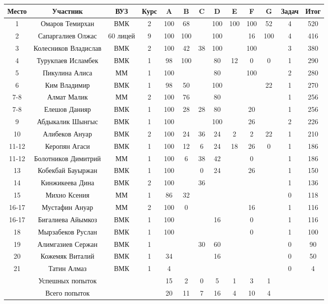 \begin{center}
\begin{longtable}{|c|c|c|c|*{7}{c|}c|c|}
\hline 
Место & Участник & ВУЗ & Курс & A & B & C & D & E & F & G & Задач & Итог\\
\hline
\endhead
1 &
Омаров Темирхан  &
ВМК & 2 &
100 &
68 &
  &
100 &
100 &
100 &
52 &
4 &
520 \\
\hline
2 &
Сапаргалиев Олжас &
60 лицей & 9 &
 100 &
 100 &
  &
100 &
  &
16 &
100 &
4 &
416 \\
\hline
3 &
Колесников Владислав &
ВМК & 2 &
100 &
42 &
38 &
100 &
  &
100 &
  &
3 &
380 \\
\hline
4 &
Турукпаев Исламбек  &
ВМК & 1 &
98 &
100 &
  &
80 &
12 &
0 &
0 &
1 &
290 \\
\hline
5 &
Пикулина Алиса &
ММ & 1 &
100 &
  &
  &
80 &
  &
100 &
  &
2 &
280 \\
\hline
6 &
Ким Владимир &
ВМК & 1 &
98 &
50 &
  &
100 &
  &
  &
22 &
1 &
270 \\
\hline
7-8 &
Алмат Малик &
ММ & 2 &
100 &
76 &
  &
80 &
  &
  &
  &
1 &
256 \\
\hline
7-8 &
Елешов Данияр &
ВМК & 1 &
100 &
28 &
28 &
80 &
  &
20 &
  &
1 &
256 \\
\hline
9 &
Абдыкалик Шынгыс &
ВМК & 1 &
100 &
  &
  &
100 &
  &
26 &
  &
2 &
226 \\
\hline
10 &
Алибеков Ануар &
ВМК & 2 &
100 &
24 &
36 &
24 &
2 &
2 &
22 &
1 &
210 \\
\hline
11-12 &
Керопян Агаси &
ВМК & 1 &
100 &
12 &
6 &
24 &
18 &
26 &
0 &
1 &
186 \\
\hline
11-12 &
Болотников Димитрий &
ММ & 1 &
100 &
6 &
38 &
42 &
  &
0 &
  &
1 &
186 \\
\hline
13 &
Кобекбай Бауыржан &
ВМК & 1 &
100 &
  &
0 &
24 &
  &
26 &
  &
1 &
150 \\
\hline
14 &
Кинжикеева Дина &
ВМК & 2 &
100 &
  &
36 &
  &
  &
  &
  &
1 &
136 \\
\hline
15 &
Михно Ксения &
ММ & 1 &
86 &
32 &
  &
  &
  &
  &
  &
0 &
118 \\
\hline
16-17 &
Мустафин Ануар &
ММ & 2 &
100 &
0 &
  &
  &
  &
16 &
  &
1 &
116 \\
\hline
16-17 &
Бигалиева Айымкоз &
ВМК & 1 &
100 &
  &
  &
16 &
  &
0 &
  &
1 &
116 \\
\hline
18 &
Мырзабеков Руслан &
ВМК & 1 &
100 &
  &
  &
  &
  &
0 &
  &
1 &
100 \\
\hline
19 &
Алимгазиев Сержан &
ВМК & 1 &
  &
  &
30 &
60 &
  &
  &
  &
0 &
90 \\
\hline
20 &
Кожемяк Виталий &
ВМК & 1 &
34 &
  &
  &
16 &
  &
  &
  &
0 &
50 \\
\hline
21 &
Татин Алмаз &
ВМК & 1 &
4 &
  &
  &
  &
  &
  &
  &
0 &
4 \\
\hline
 & Успешных попыток & & &
15 &
2 &
0 &
5 &
1 &
3 &
1 & & \\
\hline 
 & Всего попыток & & &
20 &
11 &
7 &
16 &
4 &
10 &
4 & & \\
\hline 
\end{longtable} 
\end{center}